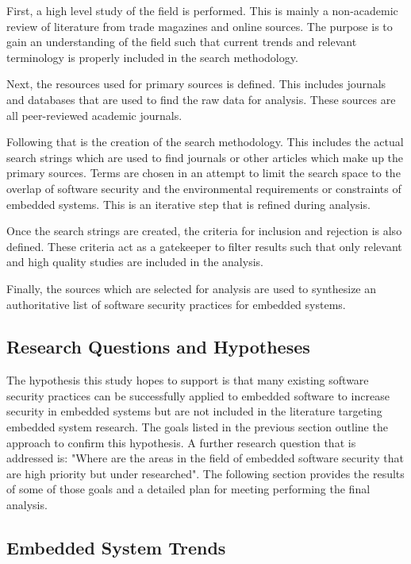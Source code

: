 \documentclass[draftcls,onecolumn,conference,12pt]{IEEEtran}
\begin{document}
First, a high level study of the field is performed.  This is mainly a non-academic review of literature from trade magazines and online sources. The purpose is to gain an understanding of the field such that current trends and relevant terminology is properly included in the search methodology.

Next, the resources used for primary sources is defined.  This includes journals and databases that are used to find the raw data for analysis.  These sources are all peer-reviewed academic journals.

Following that is the creation of the search methodology.  This includes the actual search strings which are used to find journals or other articles which make up the primary sources.  Terms are chosen in an attempt to limit the search space to the overlap of software security and the environmental requirements or constraints of embedded systems.  This is an iterative step that is refined during analysis.

Once the search strings are created, the criteria for inclusion and rejection is also defined.  These criteria act as a gatekeeper to filter results such that only relevant and high quality studies are included in the analysis.

Finally, the sources which are selected for analysis are used to synthesize an authoritative list of software security practices for embedded systems.  

\subsection{Research Questions and Hypotheses}

The hypothesis this study hopes to support is that many existing software security practices can be successfully applied to embedded software to increase security in embedded systems but are not included in the literature targeting embedded system research.  The goals listed in the previous section outline the approach to confirm this hypothesis.  A further research question that is addressed is: "Where are the areas in the field of embedded software security that are high priority but under researched". The following section provides the results of some of those goals and a detailed plan for meeting performing the final analysis.

\subsection{Embedded System Trends}
\end{document}

